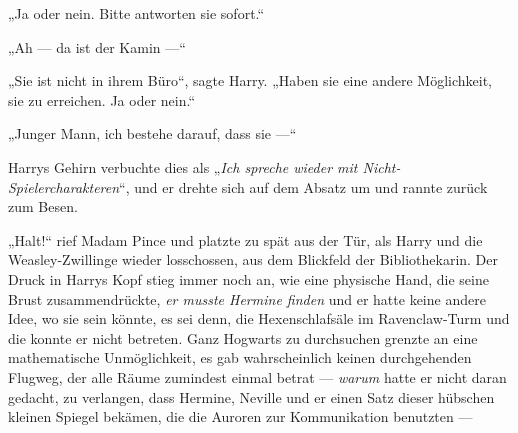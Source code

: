 „Ja oder nein. Bitte antworten sie sofort.“

„Ah — da ist der Kamin —“

„Sie ist nicht in ihrem Büro“, sagte Harry.
„Haben sie eine andere Möglichkeit, sie zu erreichen. Ja oder nein.“

„Junger Mann, ich bestehe darauf, dass sie —“

Harrys Gehirn verbuchte dies als
„\emph{Ich spreche wieder mit Nicht-Spielercharakteren}“, und er drehte sich auf dem Absatz um und rannte zurück zum Besen.

„Halt!“ rief Madam Pince und platzte zu spät aus der Tür, als Harry und die Weasley-Zwillinge wieder losschossen, aus dem Blickfeld der Bibliothekarin.
Der Druck in Harrys Kopf stieg immer noch an, wie eine physische Hand, die seine Brust zusammendrückte, \emph{er musste Hermine finden} und er hatte keine andere Idee, wo sie sein könnte, es sei denn, die Hexenschlafsäle im Ravenclaw-Turm und die konnte er nicht betreten. Ganz Hogwarts zu durchsuchen grenzte an eine mathematische Unmöglichkeit, es gab wahrscheinlich keinen durchgehenden Flugweg, der alle Räume zumindest einmal betrat — \emph{warum} hatte er nicht daran gedacht, zu verlangen, dass Hermine, Neville und er einen Satz dieser hübschen kleinen Spiegel bekämen, die die Auroren zur Kommunikation benutzten —

